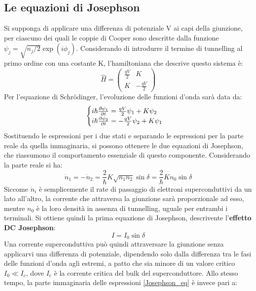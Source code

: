 \subsection{Le equazioni di Josephson}
Si supponga di applicare una differenza di potenziale V ai capi della giunzione, per ciascuno dei quali le coppie di Cooper sono descritte dalla funzione $\psi_j=\sqrt{n_{j}/2}\exp(i\phi_j)$. Considerando di introdurre il termine di tunnelling al primo ordine con una costante K, l'hamiltoniana che descrive questo sistema è:
\begin{equation*}
    \hat H = \begin{pmatrix}
            \frac{qV}{2} & K \\
            K & -\frac{qV}{2}
    \end{pmatrix}
\end{equation*}
Per l'equazione di Schrödinger, l'evoluzione delle funzioni d'onda sarà data da:
\begin{equation}
    \label{Josephson_eq}
    \begin{cases}
        i\hbar\partialderivative{\psi_1}{t}=\frac{qV}{2}\psi_1+K\psi_2\\
        i\hbar\partialderivative{\psi_2}{t}=-\frac{qV}{2}\psi_2+K\psi_1
    \end{cases}
\end{equation}
Sostituendo le espressioni per i due stati e separando le espressioni per la parte reale da quella immaginaria, si possono ottenere le due equazioni di Josephson, che riassumono il comportamento essenziale di questo componente. Considerando la parte reale si ha:
\begin{equation*}
    \dot{n}_1=-\dot{n}_2=\frac{2}{\hbar}K\sqrt{n_1n_2}\sin\delta=\frac{2}{\hbar}Kn_0\sin\delta
\end{equation*}
Siccome $\dot n_i$ è semplicemente il rate di passaggio di elettroni superconduttivi da un lato all'altro, la corrente che attraversa la giunzione sarà proporzionale ad esso, mentre $n_0$ è la loro densità in assenza di tunnelling, uguale per entrambi i terminali. Si ottiene quindi la prima equazione di Josephson, descrivente l'\textbf{effetto DC Josephson}:
\begin{equation*}
    I=I_0\sin\delta
\end{equation*}
Una corrente superconduttiva può quindi attraversare la giunzione senza applicarvi una differenza di potenziale, dipendendo solo dalla differenza tra le fasi delle funzioni d'onda agli estremi, a patto che sia minore di un valore critico $I_0\ll I_c$, dove $I_c$ è la corrente critica del bulk del superconduttore. Allo stesso tempo, la parte immaginaria delle espressioni \eqref{Josephson_eq} è invece pari a:
